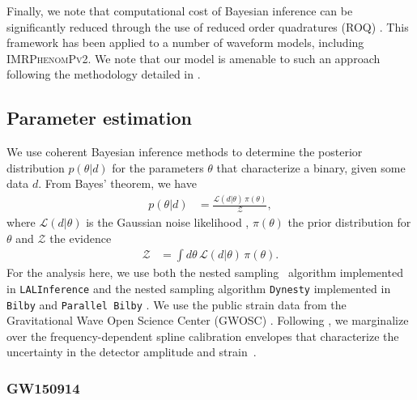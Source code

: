 \documentclass[%
aps,
prd,
amssymb,
amsmath,
amsfonts,
eqsecnum,
showpacs,
nofootinbib,
floatfix,
twocolumn,
twoside,
a4paper,
superscriptaddress
]{revtex4-1}
\newcommand{\ppvtwo}{\textsc{IMRPhenomPv2}\xspace}
\begin{document}
Finally, we note that computational cost of Bayesian inference can be significantly reduced through the use of reduced order quadratures (ROQ) \cite{Antil:2012wf,Canizares:2013ywa,Canizares:2014fya}. This framework has been applied to a number of waveform models, including \ppvtwo \cite{Smith:2016qas}. We note that our model is amenable to such an approach following the methodology detailed in \cite{Smith:2016qas}. 



\subsection{Parameter estimation}\label{sec:pe}
We use coherent Bayesian inference methods to determine the posterior distribution $p({\theta} | {d})$ for the parameters $\theta$ that characterize a binary, given some data $d$. From Bayes' theorem, we have
\begin{align}
    p(\theta | d) &= \frac{\mathcal{L}(d | \theta) \, \pi (\theta)}{\mathcal{Z}} ,
\end{align}
\newline 
where $\mathcal{L}(d | \theta)$ is the Gaussian noise likelihood \cite{Veitch:2008wd,Veitch:2009hd,Veitch:2014wba}, $\pi (\theta)$ the prior distribution for $\theta$ and $\mathcal{Z}$ the evidence 
\begin{align}
    \mathcal{Z} &= \int d \theta \, \mathcal{L} (d | \theta) \, \pi (\theta) . 
\end{align}
\newline 
For the analysis here, we use both the nested sampling~\cite{Skilling:2004ns} algorithm implemented in \texttt{LALInference} \cite{Veitch:2014wba} and the nested sampling algorithm \texttt{Dynesty} \cite{Speagle:2020spe} implemented in \texttt{Bilby} \cite{Ashton:2018jfp} and \texttt{Parallel Bilby} \cite{Smith:2019ucc}. We use the public strain data from the Gravitational Wave Open Science Center (GWOSC) \cite{GWOSC,Abbott:2019ebz,gwtc1calib,gwtc1psd}. Following \cite{LIGOScientific:2018mvr}, we marginalize over the frequency-dependent spline calibration envelopes that characterize the uncertainty in the detector amplitude and strain~\cite{Cahillane:2017vkb,Viets:2017yvy,Kissel:2018cal}.

\subsubsection{GW150914}\label{sec:GW150914}
\end{document}
